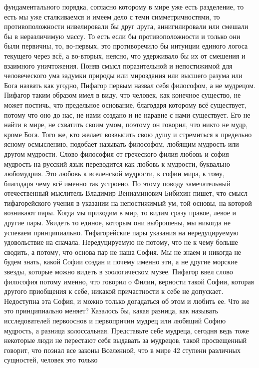 фундаментального порядка, согласно которому в мире уже есть разделение, то есть
мы уже сталкиваемся и имеем дело с теми симметричностями, то противоположности
нивелировали бы друг друга, аннигилировали или смешали бы в неразличимую массу.
То есть если бы противоположности и только они были первичны, то, во-первых, это
противоречило бы интуиции единого логоса текущего через всё, а во-вторых,
неясно, что удерживало бы их от смешения и взаимного уничтожения. Поняв смысл
поразительной и непостижимой для человеческого ума задумки природы или
мироздания или высшего разума или Бога назвать как угодно, Пифагор первым назвал
себя философом, а не мудрецом. Пифагор таким образом имел в виду, что человек,
как конечное существо, не может постичь, что предельное основание, благодаря
которому всё существует, потому что оно до нас, не нами создано и не наравне с
нами существует. Его не найти в мире, не схватить своим умом, поэтому он
говорил, что никто не мудр, кроме Бога. Того же, кто желает возвысить свою душу
и стремиться к предельно ясному осмыслению, подобает называть философом, любящим
мудрость или другом мудрости. Слово философия от греческого филия любовь и софия
мудрость на русский язык переводится как любовь к мудрости, буквально
любомудрия. Это любовь к вселенской мудрости, к софии мира, к тому, благодаря
чему всё именно так устроено. По этому поводу замечательный отечественный
мыслитель Владимир Вениаминович Бибихин пишет, что смысл тифагорейского учения в
указании на непостижимый ум, той основы, на которой возникают пары. Когда мы
приходим в мир, то видим сразу правое, левое и другие пары. Увидеть то единое,
которым они выброшены, мы никогда не успеваем принципиально. Тифагорейские пары
указания на нередуцируемую удовольствие на сначала. Нередуцируемую не потому,
что не к чему больше сводить, а потому, что основа пар не наша София. Мы не
знаем и никогда не будем знать, какой Софии создан и почему именно эти, а не
другие морские звезды, которые можно видеть в зоологическом музее. Пифагор ввел
слово философия потому именно, что говорил о Филии, верности такой Софии,
которая другого приобщения к себе, никакой причастности к себе не допускает.
Недоступна эта София, и можно только догадаться об этом и любить ее. Что же это
принципиально меняет? Казалось бы, какая разница, как называть исследователей
первооснов и первопричин мудрец или любящий Софию мудрость, а разница
колоссальная. Представьте себе мудреца, сегодня ведь тоже некоторые люди не
перестают себя выдавать за мудрецов, такой просвещенный говорит, что познал все
законы Вселенной, что в мире 42 ступени различных сущностей, человек это только
